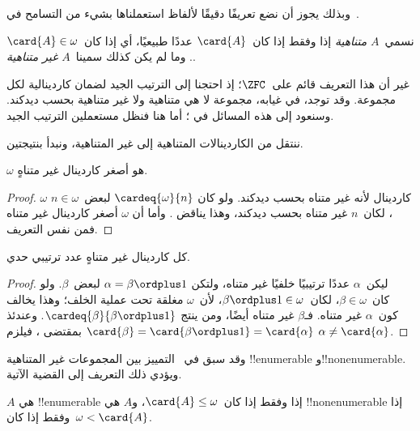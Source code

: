 \documentclass[../../../include/open-logic-section]{subfiles}
\begin{document}
وبذلك يجوز أن نضع تعريفًا دقيقًا لألفاظ استعملناها بشيء من التسامح
في~.

\begin{defn}
نسمي~$A$ \emph{متناهية} إذا وفقط إذا كان~$\card{A}$ عددًا طبيعيًا،
أي إذا كان~$\card{A} \in \omega$. وما لم يكن كذلك سمينا~$A$
\emph{غير متناهية}.
\end{defn}
\noindent
غير أن هذا التعريف قائم على~$\ZFC$؛ إذ احتجنا إلى الترتيب الجيد
لضمان كاردينالية لكل مجموعة. وقد توجد، في غيابه، مجموعة لا هي متناهية
ولا غير متناهية بحسب ديدكند. وسنعود إلى هذه المسائل في
؛ أما هنا فنظل مستعملين الترتيب الجيد.

ننتقل من الكاردينالات المتناهية إلى غير المتناهية، ونبدأ بنتيجتين.

\begin{cor}
$\omega$ هو أصغر كاردينال غير متناهٍ.
\end{cor}

\begin{proof}
$\omega$ كاردينال لأنه غير متناه بحسب ديدكند. ولو كان
$\cardeq{\omega}{n}$ لبعض~$n \in \omega$، لكان~$n$ غير متناه بحسب
ديدكند، وهذا يناقض
. وأما أن
$\omega$ أصغر كاردينال غير متناه فمن نفس التعريف.
\end{proof}

\begin{cor}
كل كاردينال غير متناهٍ عدد ترتيبي حدي.
\end{cor}

\begin{proof}
ليكن~$\alpha$ عددًا ترتيبيًا خلفيًا غير متناه، ولتكن
$\alpha = \beta \ordplus 1$ لبعض~$\beta$. ولو كان~$\beta\in\omega$،
لكان~$\beta\ordplus 1\in\omega$، لأن~$\omega$ مغلقة تحت عملية الخلف؛
وهذا يخالف كون~$\alpha$ غير متناه. فـ$\beta$ غير متناه أيضًا، ومن
 ينتج
$\cardeq{\beta}{\beta \ordplus 1}$. وعندئذ
$\card{\beta} = \card{\beta\ordplus 1} = \card{\alpha}$ بمقتضى
، فيلزم
$\alpha \neq \card{\alpha}$.
\end{proof}

وقد سبق في~ التمييز بين
المجموعات غير المتناهية !!{enumerable} و!!{nonenumerable}. ويؤدي ذلك
التعريف إلى القضية الآتية.

\begin{prop}
$A$ هي !!{enumerable} إذا وفقط إذا كان~$\card{A} \leq \omega$، و$A$
هي !!{nonenumerable} إذا وفقط إذا كان~$\omega < \card{A}$.
\end{prop}
\end{document}
